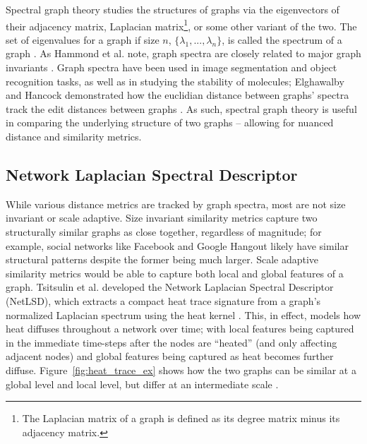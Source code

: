 Spectral graph theory studies the structures of graphs via the eigenvectors of
their adjacency matrix, Laplacian matrix\footnote{The Laplacian matrix of a
graph is defined as its degree matrix minus its adjacency matrix.}, or some
other variant of the two. The set of eigenvalues for a graph if size $n$,
$\{\lambda_{1},...,\lambda_{n}\}$, is called the spectrum of a graph
\cite{netlsd}. As Hammond et al. note, graph spectra are closely related to
major graph invariants \cite{chung1997spectral}. Graph spectra have been used in
image segmentation and object recognition tasks, as well as in studying the
stability of molecules; Elghawalby and Hancock demonstrated how the euclidian
distance between graphs' spectra track the edit distances between graphs
\cite{elghawalby2008measuring,chung1997spectral}. As such, spectral graph theory
is useful in comparing the underlying structure of two graphs -- allowing for
nuanced distance and similarity metrics.   

\subsection{Network Laplacian Spectral Descriptor}\label{sec:NetLSD}

While various distance metrics are tracked by graph spectra, most are not size
invariant or scale adaptive. Size invariant similarity metrics capture two
structurally similar graphs as close together, regardless of magnitude; for
example, social networks like Facebook and Google Hangout likely have similar
structural patterns despite the former being much larger. Scale adaptive
similarity metrics would be able to capture both local and global features of a
graph. Tsitsulin et al. developed the Network Laplacian Spectral Descriptor
(NetLSD), which extracts a compact heat trace signature from a graph's
normalized Laplacian spectrum using the heat kernel \cite{netlsd}. This, in
effect, models how heat diffuses throughout a network over time; with local features
being captured in the immediate time-steps after the nodes are ``heated'' (and
only affecting adjacent nodes) and global features being captured as heat
becomes further diffuse. Figure~\ref{fig:heat_trace_ex} shows how the two graphs
can be similar at a global level and local level, but differ at an intermediate
scale \cite{netlsd}.

